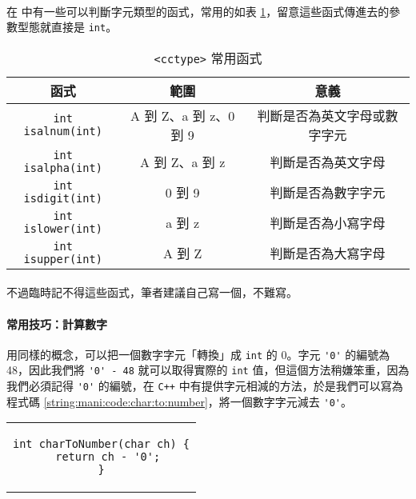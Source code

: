 \documentclass[12pt,a4paper,oneside]{report}
\begin{document}
\begin{CJK}{UTF8}{bkai}
\paragraph{}在  中有一些可以判斷字元類型的函式，常用的如表 \ref{string:mani:table:cctype}，留意這些函式傳進去的參數型態就直接是 \lstinline!int!。

\begin{table}[h!]
  \centering
  \begin{tabular}{|c|c|c|}
  \hline
  \textbf{函式} & \textbf{範圍} & \textbf{意義}\\
  \hline\hline
  \lstinline!int isalnum(int)! & A 到 Z、a 到 z、0 到 9 & 判斷是否為英文字母或數字字元\\
  \hline
  \lstinline!int isalpha(int)! & A 到 Z、a 到 z & 判斷是否為英文字母\\
  \hline
  \lstinline!int isdigit(int)! & 0 到 9 & 判斷是否為數字字元\\
  \hline
  \lstinline!int islower(int)! & a 到 z & 判斷是否為小寫字母\\
  \hline
  \lstinline!int isupper(int)! & A 到 Z & 判斷是否為大寫字母\\
  \hline
  \end{tabular}
  \caption{\lstinline!<cctype>! 常用函式}
  \label{string:mani:table:cctype}
\end{table}

\paragraph{}不過臨時記不得這些函式，筆者建議自己寫一個，不難寫。

\paragraph{常用技巧：計算數字}用同樣的概念，可以把一個數字字元「轉換」成 \lstinline!int! 的 0。字元 \lstinline!'0'! 的編號為 48，因此我們將 \lstinline!'0' - 48! 就可以取得實際的 \lstinline!int! 值，但這個方法稍嫌笨重，因為我們必須記得 \lstinline!'0'! 的編號，在 \texttt{C++} 中有提供字元相減的方法，於是我們可以寫為程式碼 \ref{string:mani:code:char:to:number}，將一個數字字元減去 \lstinline!'0'!。

\begin{code}[h!]
  \centering
  \begin{tabular}{c}
  \begin{lstlisting}
int charToNumber(char ch) {
  return ch - '0';
}
  \end{lstlisting}
  \end{tabular}
  \caption{數字字元轉換為 \lstinline!int!}
  \label{string:mani:code:char:to:number}
\end{code}


\end{CJK}
\end{document}
